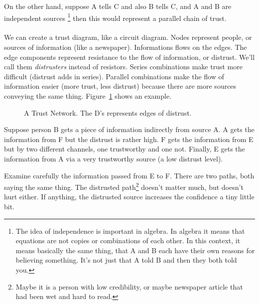 On the other hand, suppose A tells C and also B tells C, and A and B are independent sources \footnote{The idea of independence is important in algebra. In algebra it means that equations are not copies or combinations of each other. In this context, it means basically the same thing, that A and B each have their own reasons for believing something. It's not just that A told B and then they both told you.} then this would represent a parallel chain of trust.\\
\\
We can create a trust diagram, like a circuit diagram. Nodes represent people, or sources of information (like a newspaper). Informations flows on the edges. The edge components represent resistance to the flow of information, or distrust. We'll call them \emph{distrusters} instead of resistors. Series combinations make trust more difficult (distrust adds in series). Parallel combinations make the flow of information easier (more trust, less distrust) because there are more sources conveying the same thing. Figure~\ref{F:3T} shows an example.

\begin{figure}[H]
\begin{center}
\caption{A Trust Network. The D's represents edges of distrust.}
\label{F:3T}
\end{center}
\end{figure}

Suppose person B gets a piece of information indirectly from source A. A gets the information from F but the distrust is rather high. F gets the information from E but by two different channels, one trustworthy and one not. Finally, E gets the information from A via a very trustworthy source (a low distrust level).\par

Examine carefully the information passed from E to F. There are two paths, both saying the same thing. The distrusted path\footnote{Maybe it is a person with low credibility, or maybe newspaper article that had been wet and hard to read.} doesn't matter much, but doesn't hurt either. If anything, the distrusted source increases the confidence a tiny little bit.\par

